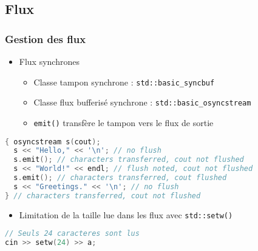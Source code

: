 \documentclass[C++.tex]{subfiles}
\begin{document}
\subsection*{Flux}
\begin{frame}[fragile]
	\frametitle{Gestion des flux}
	\begin{itemize}
		\item Flux synchrones
		\begin{itemize}
			\item Classe tampon synchrone : \lstinline|std::basic_syncbuf|
			\item Classe flux bufferisé synchrone : \lstinline|std::basic_osyncstream|
			\item \lstinline|emit()| transfère le tampon vers le flux de sortie
		\end{itemize}
	\end{itemize}


	\begin{lstlisting}[language=C++]
{ osyncstream s(cout);
  s << "Hello," << '\n'; // no flush
  s.emit(); // characters transferred, cout not flushed
  s << "World!" << endl; // flush noted, cout not flushed
  s.emit(); // characters transferred, cout flushed
  s << "Greetings." << '\n'; // no flush
} // characters transferred, cout not flushed\end{lstlisting}

	\begin{itemize}
		\item Limitation de la taille lue dans les flux avec \lstinline|std::setw()|
	\end{itemize}

	\begin{lstlisting}[language=C++]
// Seuls 24 caracteres sont lus
cin >> setw(24) >> a;\end{lstlisting}
\end{frame}
\end{document}
